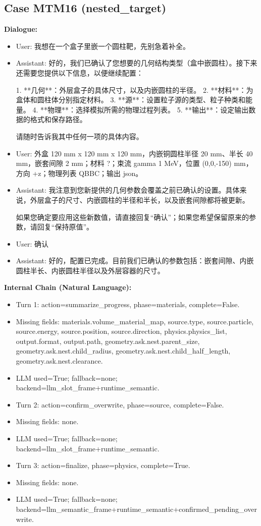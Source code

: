 \documentclass[11pt]{ctexart}
\begin{document}
\subsection{Case MTM16 (nested\_target)}
\textbf{Dialogue:}
\begin{itemize}
\item User: 我想在一个盒子里嵌一个圆柱靶，先别急着补全。
\item Assistant: 好的，我们已确认了您想要的几何结构类型（盒中嵌圆柱）。接下来还需要您提供以下信息，以便继续配置：

1.  **几何**：外层盒子的具体尺寸，以及内嵌圆柱的半径。
2.  **材料**：为盒体和圆柱体分别指定材料。
3.  **源**：设置粒子源的类型、粒子种类和能量。
4.  **物理**：选择模拟所需的物理过程列表。
5.  **输出**：设定输出数据的格式和保存路径。

请随时告诉我其中任何一项的具体内容。
\item User: 外盒 120 mm x 120 mm x 120 mm，内嵌铜圆柱半径 20 mm、半长 40 mm，嵌套间隙 2 mm；材料 ?；束流 gamma 1 MeV，位置 (0,0,-150) mm，方向 +z；物理列表 QBBC；输出 json。
\item Assistant: 我注意到您新提供的几何参数会覆盖之前已确认的设置。具体来说，外层盒子的尺寸、内嵌圆柱的半径和半长，以及嵌套间隙都将被更新。

如果您确定要应用这些新数值，请直接回复“确认”；如果您希望保留原来的参数，请回复“保持原值”。
\item User: 确认
\item Assistant: 好的，配置已完成。目前我们已确认的参数包括：嵌套间隙、内嵌圆柱半长、内嵌圆柱半径以及外层容器的尺寸。
\end{itemize}
\textbf{Internal Chain (Natural Language):}
\begin{itemize}
\item Turn 1: action=summarize\_progress, phase=materials, complete=False.
\item Missing fields: materials.volume\_material\_map, source.type, source.particle, source.energy, source.position, source.direction, physics.physics\_list, output.format, output.path, geometry.ask.nest.parent\_size, geometry.ask.nest.child\_radius, geometry.ask.nest.child\_half\_length, geometry.ask.nest.clearance.
\item LLM used=True; fallback=none; backend=llm\_slot\_frame+runtime\_semantic.
\item Turn 2: action=confirm\_overwrite, phase=source, complete=False.
\item Missing fields: none.
\item LLM used=True; fallback=none; backend=llm\_slot\_frame+runtime\_semantic.
\item Turn 3: action=finalize, phase=physics, complete=True.
\item Missing fields: none.
\item LLM used=True; fallback=none; backend=llm\_semantic\_frame+runtime\_semantic+confirmed\_pending\_overwrite.
\end{itemize}
\end{document}
